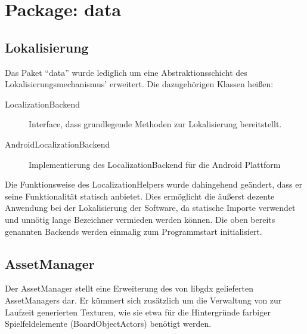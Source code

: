 \section{Package: data}
\subsection{Lokalisierung}
Das Paket "`data"' wurde lediglich um eine Abstraktionsschicht des Lokalisierungsmechanismus' erweitert.
Die dazugehörigen Klassen heißen:
\begin{description}
	\item[LocalizationBackend] Interface, dass grundlegende Methoden zur Lokalisierung bereitstellt.
	\item[AndroidLocalizationBackend] Implementierung des LocalizationBackend für die Android Plattform
\end{description}

Die Funktionsweise des LocalizationHelpers wurde dahingehend geändert, dass er seine Funktionalität statisch anbietet.
Dies ermöglicht die äußerst dezente Anwendung bei der Lokalisierung der Software, da statische Importe verwendet und unnötig lange Bezeichner vermieden werden können.
Die oben bereits genannten Backends werden einmalig zum Programmstart initialisiert.


\subsection{AssetManager}
Der AssetManager stellt eine Erweiterung des von libgdx gelieferten AssetManagers dar.
Er kümmert sich zusätzlich um die Verwaltung von zur Laufzeit generierten Texturen, wie sie etwa für die Hintergründe farbiger Spielfeldelemente (BoardObjectActors) benötigt werden.
